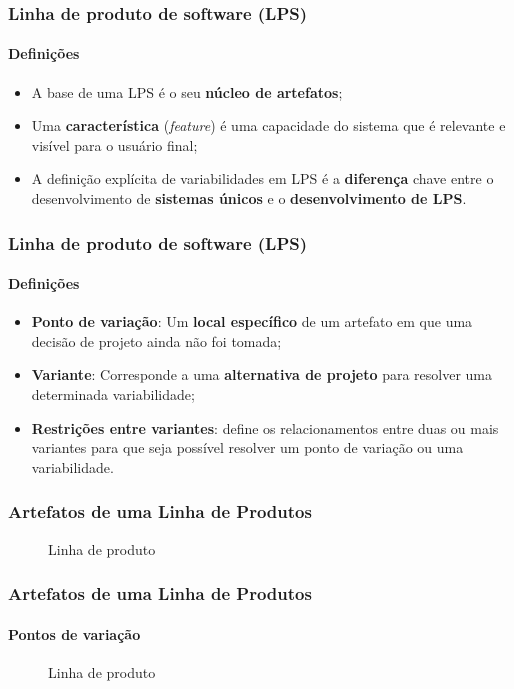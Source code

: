 \begin{frame}
\frametitle{Linha de produto de software (LPS)}
\framesubtitle{Definições}

  \begin{itemize}
    \item {
      A base de uma LPS é o seu \textbf{núcleo de artefatos};
    }
    \item {
      Uma \textbf{característica} (\textit{feature}) é uma capacidade do sistema que é relevante e visível para o usuário final;
    }
    \item {
      A definição explícita de variabilidades em LPS é a \textbf{diferença} chave entre o desenvolvimento de \textbf{sistemas únicos} e o \textbf{desenvolvimento de LPS}.
    }
  \end{itemize}

\end{frame}

\begin{frame}
\frametitle{Linha de produto de software (LPS)}
\framesubtitle{Definições}

  \begin{itemize}
    \item {
      \textbf{Ponto de variação}: Um \textbf{local específico} de um artefato em que uma decisão de projeto ainda não foi tomada;
    }
    \item {
      \textbf{Variante}: Corresponde a uma \textbf{alternativa de projeto} para resolver uma determinada variabilidade;
    }
    \item {
      \textbf{Restrições entre variantes}: define os relacionamentos entre duas ou mais variantes para que seja possível resolver um ponto de variação ou uma variabilidade.
    }
  \end{itemize}

\end{frame}

\begin{frame}
\frametitle{Artefatos de uma Linha de Produtos}

  \begin{figure}
  \caption{Linha de produto}
  \end{figure}

\end{frame}

\begin{frame}
\frametitle{Artefatos de uma Linha de Produtos}
\framesubtitle{Pontos de variação}

  \begin{figure}
  \caption{Linha de produto}
  \end{figure}

\end{frame}

